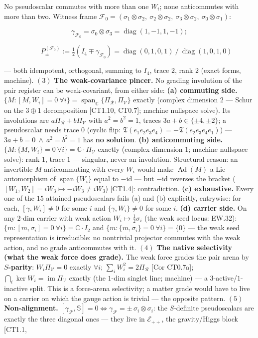 \begin{theorem}
No pseudoscalar commutes with more than one $W_i$; none anticommutes with more than two. Witness frame $\mathcal F_0=(\sigma_1\otimes\sigma_2,\ \sigma_2\otimes\sigma_2,\ \sigma_3\otimes\sigma_2,\ \sigma_0\otimes\sigma_1)$:

\[
\gamma_{\mathcal F_0}=\sigma_0\otimes\sigma_3=\operatorname{diag}(1,-1,1,-1);
\]

\[
\qquad P^{(\mathcal F_0)}_\pm:=\tfrac12(I_4\mp\gamma_{\mathcal F_0})=\operatorname{diag}(0,1,0,1)\ /\ \operatorname{diag}(1,0,1,0)
\]

— both idempotent, orthogonal, summing to $I_4$, trace $2$, rank $2$ (exact forms, machine). $(3)$ \textbf{The weak-covariance pincer.} No grading involution of the pair register can be weak-covariant, from either side: \textbf{(a) commuting side.} $\{M:[M,W_i]=0\ \forall i\}=\operatorname{span}_{\mathbb C}\{\Pi_{\mathcal R},\Pi_{\mathcal V}\}$ exactly (complex dimension $2$ — Schur on the $3\oplus1$ decomposition [CT1.10, CT0.7]; machine nullspace solve). Its involutions are $a\Pi_{\mathcal R}+b\Pi_{\mathcal V}$ with $a^2=b^2=1$, traces $3a+b\in\{\pm4,\pm2\}$; a pseudoscalar needs trace $0$ (cyclic flip: $\mathfrak T(e_1e_2e_3e_4)=-\mathfrak T(e_2e_3e_4e_1)$) — $3a+b=0\ \wedge\ a^2=b^2=1$ has \textbf{no solution}. \textbf{(b) anticommuting side.} $\{M:\{M,W_i\}=0\ \forall i\}=\mathbb C\cdot\Pi_{\mathcal V}$ exactly (complex dimension $1$; machine nullspace solve): rank $1$, trace $1$ — singular, never an involution. Structural reason: an invertible $M$ anticommuting with every $W_i$ would make $\operatorname{Ad}(M)$ a Lie automorphism of $\operatorname{span}\{W_i\}$ equal to $-\mathrm{id}$ — but $-\mathrm{id}$ reverses the bracket ($[W_1,W_2]=iW_3\mapsto-iW_3\ne iW_3$) [CT1.4]: contradiction. \textbf{(c) exhaustive.} Every one of the $15$ attained pseudoscalars fails (a) and (b) explicitly, entrywise: for each, $[\gamma,W_i]\ne0$ for some $i$ and $\{\gamma,W_i\}\ne0$ for some $i$. \textbf{(d) carrier side.} On any $2$-dim carrier with weak action $W_i\mapsto\tfrac12\sigma_i$ (the weak seed locus: EW.32): $\{m:[m,\sigma_i]=0\ \forall i\}=\mathbb C\cdot I_2$ and $\{m:\{m,\sigma_i\}=0\ \forall i\}=\{0\}$ — the weak seed representation is irreducible: no nontrivial projector commutes with the weak action, and no grade anticommutes with it. $(4)$ \textbf{The native selectivity (what the weak force does grade).} The weak force grades the pair arena by \textbf{$S$-parity}: $W_i\Pi_{\mathcal V}=0$ exactly $\forall i$; $\sum_iW_i^2=2\Pi_{\mathcal R}$ [Cor CT0.7a]; $\bigcap_i\ker W_i=\operatorname{im}\Pi_{\mathcal V}$ exactly (the $1$-dim singlet line; machine) — a $3$-active/$1$-inactive split. This is a force-arena selectivity; a matter grade would have to live on a carrier on which the gauge action is trivial — the opposite pattern. $(5)$ \textbf{Non-alignment.} $[\gamma_{\mathcal F},\mathbb S]=0\iff\gamma_{\mathcal F}=\pm\,\sigma_i\otimes\sigma_i$: the $S$-definite pseudoscalars are exactly the three diagonal ones — they live in $\mathcal E_{++}$, the gravity/Higgs block [CT1.1, 
\end{theorem}
